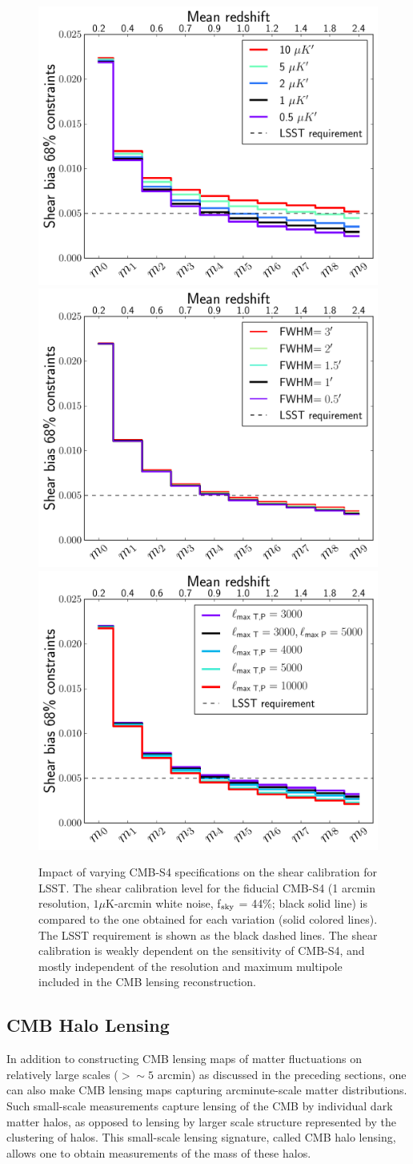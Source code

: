 \begin{figure}[htbp]
\centering
\includegraphics[width=0.32\columnwidth]{CMBLensing/LSST_varying_noise.pdf}
\includegraphics[width=0.32\columnwidth]{CMBLensing/LSST_varying_beam.pdf}
\includegraphics[width=0.32\columnwidth]{CMBLensing/LSST_varying_lmax.pdf}
\caption{Impact of varying CMB-S4 specifications on the shear calibration for LSST. The shear calibration level for the fiducial CMB-S4 (1 arcmin resolution, $1\mu$K-arcmin white noise, f$_{\rm{sky}}$ = 44\%; black solid line) is compared to the one obtained for each variation (solid colored lines). The LSST requirement is shown as the black dashed lines. The shear calibration is weakly dependent on the sensitivity of CMB-S4, and mostly independent of the resolution and maximum multipole included in the CMB lensing reconstruction.}
\label{LSSTshearcalibration_vary_noise_beam_lmax}
\end{figure}



\subsection{CMB Halo Lensing}\label{haloLensing}

In addition to constructing CMB lensing maps of matter fluctuations on relatively large scales ($> \sim 5$ arcmin) as discussed in the preceding sections, one can also make CMB lensing maps capturing arcminute-scale matter distributions. Such small-scale measurements capture lensing of the CMB by individual dark matter halos, as opposed to lensing by larger scale structure represented by the clustering of halos.  This small-scale lensing signature, called CMB halo lensing, allows one to obtain measurements of the mass of these halos.  

